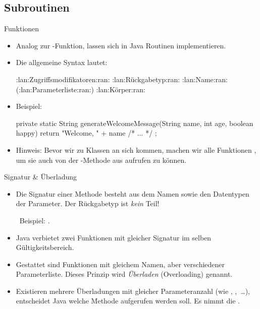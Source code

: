 \subsection{Subroutinen}
\begin{frame}[fragile]{Funktionen}
    \begin{itemize}[<+(1)->]
        \item Analog zur -Funktion, lassen sich in Java Routinen implementieren.
        \item Die allgemeine Syntax lautet:\pause{}
{\footnotesize
\begin{plainjava}
:lan:Zugriffsmodifikatoren:ran: :lan:Rückgabetyp:ran: :lan:Name:ran:(:lan:Parameterliste:ran:) {
    :lan:Körper:ran:
}
\end{plainjava}
}
        \item Beispiel: \pause{}
{\footnotesize
\begin{plainjava}
private static String generateWelcomeMessage(String name, int age,
        boolean happy) {
    return "Welcome, " + name /* ... */ ;
}
\end{plainjava}
}
        \item Hinweis:\pause{} Bevor wir zu Klassen an sich kommen,\pause{} machen wir alle Funktionen ,\pause{} um sie auch von der -Methode aus aufrufen zu können.
    \end{itemize}
\end{frame}

\begin{frame}{Signatur \& Überladung}
    \begin{itemize}[<+(1)->]
        \widei
        \item Die Signatur einer Methode besteht aus dem Namen sowie den Datentypen der Parameter.\pause{} Der Rückgabetyp ist \emph{kein} Teil!\smallskip\par
         \faAngleRight~Beispiel: .
        \item Java verbietet zwei Funktionen mit gleicher Signatur im selben Gültigkeitsbereich.
        \item Gestattet sind Funktionen mit gleichem Namen, aber verschiedener Parameterliste.\pause{} Dieses Prinzip wird \emph{Überladen} (Overloading) genannt.
        \item Existieren mehrere Überladungen mit gleicher Parameteranzahl\pause{} (wie , ,~\ldots),\pause{} entscheidet Java welche Methode aufgerufen werden soll.\pause{} Es nimmt die .
    \end{itemize}
\end{frame}


